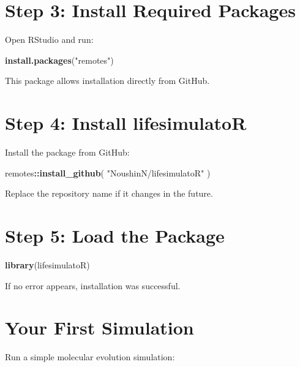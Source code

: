 \documentclass[
  oneside,
  openany]{book}
\newenvironment{Shaded}{\begin{snugshade}}{\end{snugshade}}
\newcommand{\FunctionTok}[1]{\textcolor[rgb]{0.13,0.29,0.53}{\textbf{#1}}}
\newcommand{\NormalTok}[1]{#1}
\newcommand{\SpecialCharTok}[1]{\textcolor[rgb]{0.81,0.36,0.00}{\textbf{#1}}}
\newcommand{\StringTok}[1]{\textcolor[rgb]{0.31,0.60,0.02}{#1}}
\begin{document}
\section{Step 3: Install Required Packages}\label{step-3-install-required-packages}

Open RStudio and run:

\begin{Shaded}
\begin{Highlighting}[]
\FunctionTok{install.packages}\NormalTok{(}\StringTok{"remotes"}\NormalTok{)}
\end{Highlighting}
\end{Shaded}

This package allows installation directly from GitHub.

\section{Step 4: Install lifesimulatoR}\label{step-4-install-lifesimulator}

Install the package from GitHub:

\begin{Shaded}
\begin{Highlighting}[]
\NormalTok{remotes}\SpecialCharTok{::}\FunctionTok{install\_github}\NormalTok{(}
  \StringTok{"NoushinN/lifesimulatoR"}
\NormalTok{)}
\end{Highlighting}
\end{Shaded}

Replace the repository name if it changes in the future.

\section{Step 5: Load the Package}\label{step-5-load-the-package}

\begin{Shaded}
\begin{Highlighting}[]
\FunctionTok{library}\NormalTok{(lifesimulatoR)}
\end{Highlighting}
\end{Shaded}

If no error appears, installation was successful.

\section{Your First Simulation}\label{your-first-simulation}

Run a simple molecular evolution simulation:
\end{document}
